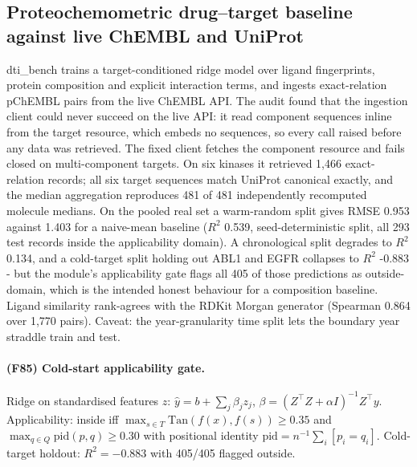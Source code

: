 \subsection{Proteochemometric drug--target baseline against live ChEMBL and UniProt}
dti\_bench trains a target-conditioned ridge model over ligand fingerprints, protein composition and explicit interaction terms, and ingests exact-relation pChEMBL pairs from the live ChEMBL API. The audit found that the ingestion client could never succeed on the live API: it read component sequences inline from the target resource, which embeds no sequences, so every call raised before any data was retrieved. The fixed client fetches the component resource and fails closed on multi-component targets. On six kinases it retrieved 1,466 exact-relation records; all six target sequences match UniProt canonical exactly, and the median aggregation reproduces 481 of 481 independently recomputed molecule medians. On the pooled real set a warm-random split gives RMSE 0.953 against 1.403 for a naive-mean baseline ($R^2$ 0.539, seed-deterministic split, all 293 test records inside the applicability domain). A chronological split degrades to $R^2$ 0.134, and a cold-target split holding out ABL1 and EGFR collapses to $R^2$ -0.883 - but the module's applicability gate flags all 405 of those predictions as outside-domain, which is the intended honest behaviour for a composition baseline. Ligand similarity rank-agrees with the RDKit Morgan generator (Spearman 0.864 over 1,770 pairs). Caveat: the year-granularity time split lets the boundary year straddle train and test.
\paragraph{(F85) Cold-start applicability gate.} Ridge on standardised features $z$: $\hat y=b+\sum_j\beta_j z_j$, $\beta=(Z^{\top}Z+\alpha I)^{-1}Z^{\top}y$. Applicability: inside iff $\max_{s\in T}\mathrm{Tan}(f(x),f(s))\ge 0.35$ and $\max_{q\in Q}\mathrm{pid}(p,q)\ge 0.30$ with positional identity $\mathrm{pid}=n^{-1}\sum_i[p_i=q_i]$. Cold-target holdout: $R^2=-0.883$ with 405/405 flagged outside.
